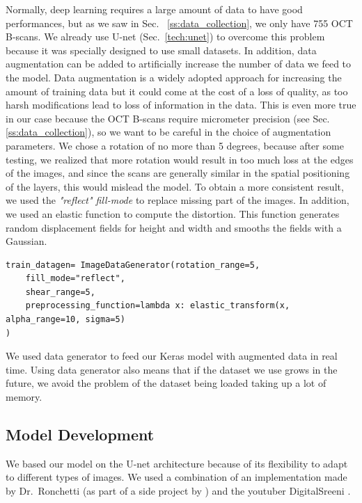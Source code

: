 \documentclass[12pt,a4paper]{scrartcl}
\begin{document}
Normally, deep learning requires a large amount of data to have good performances, but as we saw in Sec.~ \ref{ss:data_collection}, we only have 755 OCT B-scans. We already use U-net (Sec.~\ref{tech:unet}) to overcome this problem because it was specially designed to use small datasets. In addition, data augmentation can be added to artificially increase the number of data we feed to the model. Data augmentation is a widely adopted approach for increasing the amount of training data \cite{AugAndEval:2017} but it could come at the cost of a loss of quality, as too harsh modifications lead to loss of information in the data. This is even more true in our case because the OCT B-scans require micrometer precision (see Sec.~ \ref{ss:data_collection}), so we want to be careful in the choice of augmentation parameters.
We chose a rotation of no more than 5 degrees, because after some testing, we realized that more rotation would result in too much loss at the edges of the images, and since the scans are generally similar in the spatial positioning of the layers, this would mislead the model. To obtain a more consistent result, we used the \emph{"reflect" fill-mode}  to replace missing part of the images. In addition, we used an elastic function to compute the distortion. This function generates random displacement fields for height and width and smooths the fields with a Gaussian. 
\begin{lstlisting}[caption={Base generator for image augmentation, the definition of the 2 separate generators (image and mask) can be found in \emph{train.py}}]
train_datagen= ImageDataGenerator(rotation_range=5,
    fill_mode="reflect",
    shear_range=5,
    preprocessing_function=lambda x: elastic_transform(x, alpha_range=10, sigma=5)
)
\end{lstlisting}

We used data generator to feed our Keras model with augmented data in real time. Using data generator also means that if the dataset we use grows in the future, we avoid the problem of the dataset being loaded taking up a lot of memory.


\subsection{Model Development}

We based our model on the U-net architecture because of its flexibility to adapt to different types of images. We used a combination of an implementation made by Dr.~Ronchetti (as part of a side project by \cite{Ronchetti2019}) and the youtuber DigitalSreeni \cite{DigitalSreeni}.
\end{document}
